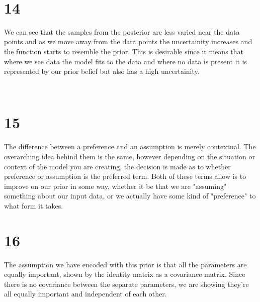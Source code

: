 \documentclass[11pt]{article}
\begin{document}
    \begin{center}
    \end{center}
    { \hspace*{\fill} \\}
    
    \section*{14}\label{section}

We can see that the samples from the posterior are less varied near the
data points and as we move away from the data points the uncertainity
increases and the function starts to resemble the prior. This is
desirable since it means that where we see data the model fits to the
data and where no data is present it is represented by our prior belief
but also has a high uncertainity.


    \begin{center}
    \end{center}
    { \hspace*{\fill} \\}
    
    \section*{15}\label{section}

The difference between a preference and an assumption is merely
contextual. The overarching idea behind them is the same, however
depending on the situation or context of the model you are creating, the
decision is made as to whether preference or assumption is the preferred
term. Both of these terms allow is to improve on our prior in some way,
whether it be that we are "assuming" something about our input data, or
we actually have some kind of "preference" to what form it takes.

    \section*{16}\label{section}

The assumption we have encoded with this prior is that all the
parameters are equally important, shown by the identity matrix as a
covariance matrix. Since there is no covariance between the separate
parameters, we are showing they're all equally important and independent
of each other.
\end{document}
